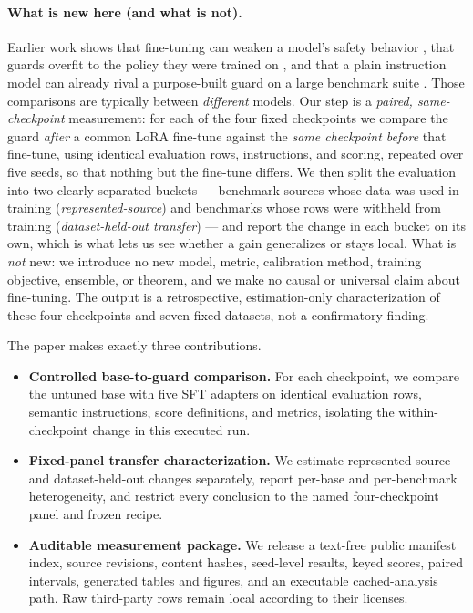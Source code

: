 \documentclass[11pt]{article}
\begin{document}
\paragraph{What is new here (and what is not).} Earlier work shows that fine-tuning can weaken a model's safety behavior \cite{hsiung2025guardrails}, that guards overfit to the policy they were trained on \cite{liu2026domaingeneralizable}, and that a plain instruction model can already rival a purpose-built guard on a large benchmark suite \cite{bassani2024guardbench}. Those comparisons are typically between \emph{different} models. Our step is a \emph{paired, same-checkpoint} measurement: for each of the four fixed checkpoints we compare the guard \emph{after} a common LoRA fine-tune against the \emph{same checkpoint before} that fine-tune, using identical evaluation rows, instructions, and scoring, repeated over five seeds, so that nothing but the fine-tune differs. We then split the evaluation into two clearly separated buckets --- benchmark sources whose data was used in training (\emph{represented-source}) and benchmarks whose rows were withheld from training (\emph{dataset-held-out transfer}) --- and report the change in each bucket on its own, which is what lets us see whether a gain generalizes or stays local. What is \emph{not} new: we introduce no new model, metric, calibration method, training objective, ensemble, or theorem, and we make no causal or universal claim about fine-tuning. The output is a retrospective, estimation-only characterization of these four checkpoints and seven fixed datasets, not a confirmatory finding.

The paper makes exactly three contributions.

\begin{itemize}
  \item \textbf{Controlled base-to-guard comparison.} For each checkpoint, we compare the untuned base with five SFT adapters on identical evaluation rows, semantic instructions, score definitions, and metrics, isolating the within-checkpoint change in this executed run.
  \item \textbf{Fixed-panel transfer characterization.} We estimate represented-source and dataset-held-out changes separately, report per-base and per-benchmark heterogeneity, and restrict every conclusion to the named four-checkpoint panel and frozen recipe.
  \item \textbf{Auditable measurement package.} We release a text-free public manifest index, source revisions, content hashes, seed-level results, keyed scores, paired intervals, generated tables and figures, and an executable cached-analysis path. Raw third-party rows remain local according to their licenses.
\end{itemize}
\end{document}
